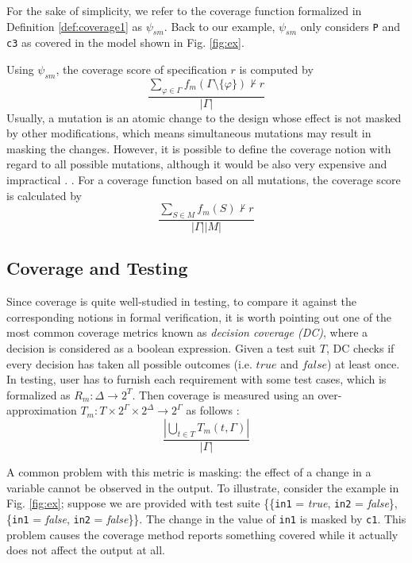 For the sake of simplicity, we refer to the coverage function
formalized in Definition \ref{def:coverage1} as $\psi_{sm}$.
Back to our example, $\psi_{sm}$ only considers {\tt P} and {\tt c3} as covered in the model shown in Fig. \ref{fig:ex}.

Using $\psi_{sm}$, the coverage score of specification $r$ is computed by $$\frac{\sum_{\varphi \in \Gamma} f_m (\Gamma \setminus \{ \varphi \}) \nvdash r}{|\Gamma|}$$
Usually, a mutation is an atomic change to the design whose effect is not masked by other modifications, which means simultaneous mutations may result in masking the changes. However,
it is possible to define the coverage notion with regard to all possible mutations, although it would be also very expensive and impractical \cite{chockler2001practical}. .
For a coverage function based on all mutations, the coverage score is calculated by
$$ \frac{\sum_{S \in M} f_m (S) \nvdash r}{|\Gamma| |M|}$$
\fi

\subsection{Coverage and Testing}

Since coverage is quite well-studied in testing, to compare it against the corresponding notions in formal verification, it is worth pointing out one of the most common coverage metrics known as \emph{decision coverage (DC)}, where a decision is considered as a boolean expression.  Given a test suit $T$, DC checks if every decision has taken all possible outcomes (i.e. $true$ and $false$) at least once. In testing, user has to furnish each requirement with some test cases, which is formalized as $R_m : \Delta \rightarrow 2^T$. Then coverage is measured using an over-approximation $T_m : T \times 2^\Gamma \times 2^\Delta \rightarrow 2^\Gamma$ as follows \cite{chelenski1994oapplicability, schuler_assessing_2011, murugesan2015we}: $$\frac{|\bigcup_{t \in T} T_m (t, \Gamma)|}{|\Gamma|}$$

A common problem with this metric is masking:
the effect of a change in a variable cannot be observed in the output. To illustrate, consider the example in Fig. \ref{fig:ex}; suppose we are provided with
test suite \{\{{\tt in1} = \emph{true}, {\tt in2} = \emph{false}\},
\{{\tt in1} = \emph{false}, {\tt in2} = \emph{false}\}\}. The change in the value of
{\tt in1} is masked by {\tt c1}. This problem causes the coverage method reports something covered
while it actually does not affect the output at all.




